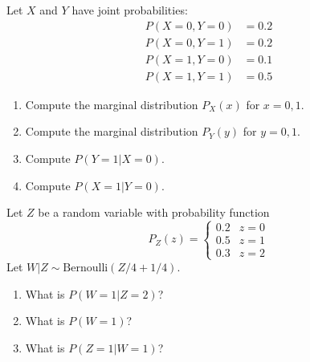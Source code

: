 \begin{exercise}
Let $X$ and $Y$ have joint probabilities:
\begin{align*}
P(X=0, Y=0) &= 0.2 \\
P(X=0, Y=1) &= 0.2 \\
P(X=1, Y=0) &= 0.1 \\
P(X=1, Y=1) &= 0.5
\end{align*}
\begin{enumerate}[label=(\alph*)]
\item Compute the marginal distribution $P_X(x)$ for $x=0,1$.
\item Compute the marginal distribution $P_Y(y)$ for $y=0,1$.
\item Compute $P(Y=1|X=0)$.
\item Compute $P(X=1|Y=0)$.
\end{enumerate}
\end{exercise}

\begin{exercise}
Let $Z$ be a random variable with probability function
\begin{equation*}
P_Z(z) = \begin{cases}
  0.2 & z=0 \\
  0.5 & z=1 \\
  0.3 & z=2
\end{cases}
\end{equation*}
Let $W|Z \sim \text{Bernoulli}(Z/4 + 1/4)$.
\begin{enumerate}[label=(\alph*)]
\item What is $P(W=1|Z=2)$?
\item What is $P(W=1)$?
\item What is $P(Z=1|W=1)$?
\end{enumerate}
\end{exercise}

